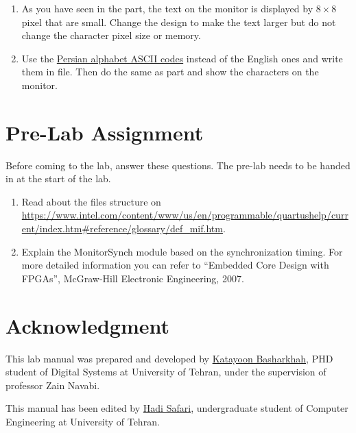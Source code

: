 \documentclass[12pt, logo=tehranDLDL/ut]{tehranDLDL}
\begin{document}
\begin{enumerate}
    \item As you have seen in the  part, the text on the monitor is displayed by $8\times8$ pixel that are small. Change the design to make the text larger but do not change the character pixel size or memory.
    \item Use the \ul{Persian alphabet ASCII codes} instead of the English ones and write them in  file. Then do the same as  part and show the characters on the monitor.
\end{enumerate}

\designverification{}

\section*{Pre-Lab Assignment}
Before coming to the lab, answer these questions. The pre-lab needs to be handed in at the start of the lab.

\begin{enumerate}
    \item Read about the  files structure
    on \url{https://www.intel.com/content/www/us/en/programmable/quartushelp/current/index.htm#reference/glossary/def_mif.htm}.
    \item Explain the MonitorSynch module based on the  synchronization timing.
    For more detailed information you can refer to
    ``Embedded Core Design with FPGAs'', McGraw-Hill Electronic Engineering, 2007.
\end{enumerate}


\section*{Acknowledgment}

This lab manual was prepared and developed by \href{mailto:ktbasharkhah@gmail.com?subject=[DLDLab]\%20}{Katayoon Basharkhah}, PHD student of Digital Systems at University of Tehran, under the supervision of professor Zain Navabi.

This manual has been edited by \href{mailto:hadi.safari@ut.ac.ir?subject=[DLDLab]\%20}{Hadi Safari}, undergraduate student of Computer Engineering at University of Tehran.
\end{document}
